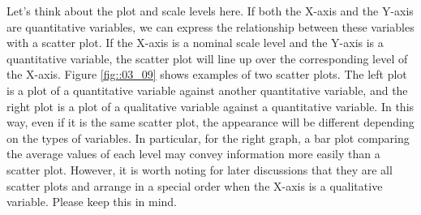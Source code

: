 \documentclass{ltjsbook}
\begin{document}
Let's think about the plot and scale levels here. If both the X-axis and the Y-axis are quantitative variables, we can express the relationship between these variables with a scatter plot. If the X-axis is a nominal scale level and the Y-axis is a quantitative variable, the scatter plot will line up over the corresponding level of the X-axis. Figure \ref{fig::03_09} shows examples of two scatter plots. The left plot is a plot of a quantitative variable against another quantitative variable, and the right plot is a plot of a qualitative variable against a quantitative variable. In this way, even if it is the same scatter plot, the appearance will be different depending on the types of variables. In particular, for the right graph, a bar plot comparing the average values of each level may convey information more easily than a scatter plot. However, it is worth noting for later discussions that they are all scatter plots and arrange in a special order when the X-axis is a qualitative variable. Please keep this in mind.

\end{document}
